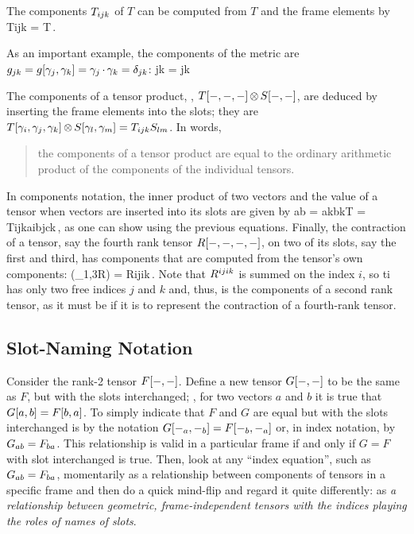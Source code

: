 The components ${T}_{ijk}$ of $T$ can be computed from $T$ and the frame elements by 
\beq
\cotens T{ijk} = T\,.
\eeq

As an important example, the components of the metric are $g_{{j}{k}} = g\!\left[{\gamma_{j},\gamma_{k}}\right] = \gamma_{j}\operatorname{\cdot}\gamma_{k} = \delta_{{j}{k}}$:
\beq
\imet jk = \ikron jk\qquad{}
\eeq

The components of a tensor product, \eg, $T\!\left[{-,-,-}\right]\operatorname{\otimes} S\!\left[{-,-}\right]$, are deduced by inserting the frame elements into the slots; they are $T\!\left[{\gamma_{i},\gamma_{j},\gamma_{k}}\right]\operatorname{\otimes} S\!\left[{\gamma_{l},\gamma_{m}}\right] = {T}_{ijk}{S}_{lm}$. In words, 
\begin{quote}
the components of a tensor product are equal to the ordinary arithmetic product of the components of the individual tensors.
\end{quote}

In components notation, the inner product of two vectors and the value of a tensor when vectors are inserted into its slots are given by
\beq
a\iprod b = \cnvec ak\covec bk\qquad{}\qquad T = \cotens T{ijk}\cnvec ai\cnvec bj\cnvec ck\,,
\eeq
as one can show using the previous equations. Finally, the contraction of a tensor, say the fourth rank tensor $R\!\left[{-,-,-,-}\right]$, on two of its slots, say the first and third, has components that are computed from the tensor's own components:
\beq
\tcomp(\tcont_{1,3}R) = \cntens R{ijik}\,.
\eeq
Note that ${R}^{ijik}$ is summed on the index $i$, so ti has only two free indices $j$ and $k$ and, thus, is the components of a second rank tensor, as it must be if it is to represent the contraction of a fourth-rank tensor.


\subsection{Slot-Naming Notation}
Consider the rank-2 tensor $F\!\left[{-,-}\right]$. Define a new tensor $G\!\left[{-,-}\right]$ to be the same as $F$, but with the slots interchanged; \ie, for two vectors $a$ and $b$ it is true that $G\!\left[{a,b}\right] = F\!\left[{b,a}\right]$. To simply indicate that $F$ and $G$ are equal but with the slots interchanged is by the notation $G\!\left[{-_a, -_b}\right] = F\!\left[{-_b, -_a}\right]$ or, in index notation, by ${G}_{ab} = {F}_{ba}$. This relationship is valid in a particular frame if and only if $G = F$ with slot interchanged is true. Then, look at any ``index equation'', such as ${G}_{ab} = {F}_{ba}$, momentarily as a relationship between components of tensors in a specific frame and then do a quick mind-flip and regard it quite differently: as \emph{a relationship between geometric, frame-independent tensors with the indices playing the roles of names of slots}.

